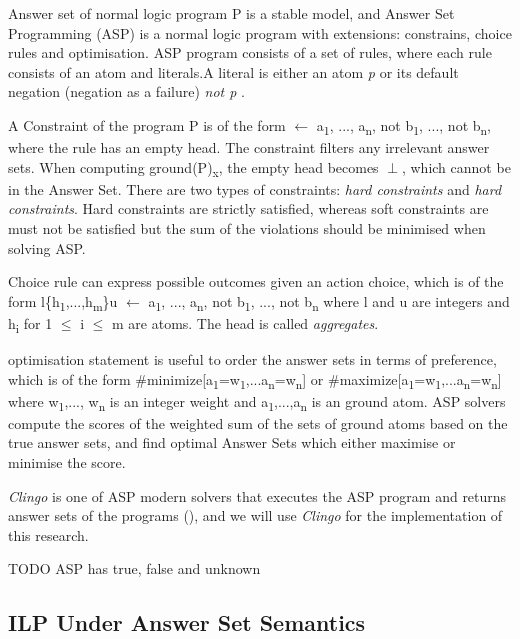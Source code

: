 \documentclass[12pt,twoside]{report}
\begin{document}
Answer set of normal logic program P is a stable model, and Answer Set Programming (ASP) is a normal logic program with extensions: constrains, choice rules and optimisation. ASP program consists of a set of rules, where each rule consists of an atom and literals.A literal is either an atom \textit{p} or its default negation (negation as a failure) \textit{not p} .

A Constraint of the program P is of the form $\leftarrow$ a\textsubscript{1}, ..., a\textsubscript{n}, not b\textsubscript{1}, ..., not b\textsubscript{n}, where the rule has an empty head. The constraint filters any irrelevant answer sets. When computing ground(P)\textsubscript{x}, the empty head becomes $\perp$, which cannot be in the Answer Set.
There are two types of constraints: \textit{hard constraints} and \textit{hard constraints}. Hard constraints are strictly satisfied, whereas soft constraints are must not be satisfied but the sum of the violations should be minimised when solving ASP.

Choice rule can express possible outcomes given an action choice, which is of the form
l\{h\textsubscript{1},...,h\textsubscript{m}\}u $\leftarrow$ a\textsubscript{1}, ..., a\textsubscript{n}, not b\textsubscript{1}, ..., not b\textsubscript{n} where  l and u are integers and h\textsubscript{i} for 1 $\leq$ i $\leq$ m are atoms. The head is called \textit{aggregates}.

optimisation statement is useful to order the answer sets in terms of preference, which is of the form
\#minimize[a\textsubscript{1}=w\textsubscript{1},...a\textsubscript{n}=w\textsubscript{n}] or \#maximize[a\textsubscript{1}=w\textsubscript{1},...a\textsubscript{n}=w\textsubscript{n}] where w\textsubscript{1},..., w\textsubscript{n} is an integer weight and a\textsubscript{1},...,a\textsubscript{n} is an ground atom.  ASP solvers compute the scores of the weighted sum of the sets of ground atoms based on the true answer sets, and find optimal Answer Sets which either maximise or minimise the score.

\textit{Clingo} is one of ASP modern solvers that executes the ASP program and returns answer sets of the programs (\cite{Gebser2011}), and we will use \textit{Clingo} for the implementation of this research.

TODO ASP has true, false and unknown

\subsection{ILP Under Answer Set Semantics}
\end{document}
